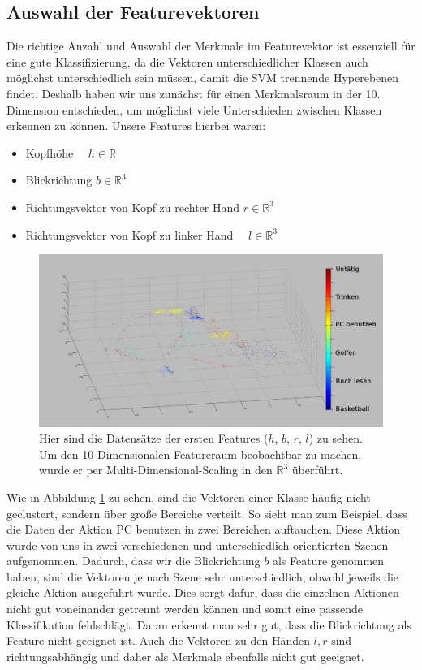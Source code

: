\subsection{Auswahl der Featurevektoren}
\label{subsec:auswahl-der-feature-vektoren}
Die richtige Anzahl und Auswahl der Merkmale im Featurevektor ist essenziell für eine gute Klassifizierung, da die Vektoren unterschiedlicher Klassen auch möglichst unterschiedlich sein müssen, damit die SVM trennende Hyperebenen findet. Deshalb haben wir uns zunächst für einen Merkmalsraum in der 10. Dimension entschieden, um möglichst viele Unterschieden zwischen Klassen erkennen zu können. Unsere Features hierbei waren:
\begin{itemize}
    \item Kopfhöhe \ \ \quad\qquad\qquad\qquad\qquad\qquad\qquad\qquad$h \in \mathbb{R}$
    \item Blickrichtung \qquad\qquad\qquad\qquad\qquad\qquad\qquad$b \in \mathbb{R}^3$
    \item Richtungsvektor von Kopf zu rechter Hand \quad $r \in \mathbb{R}^3$    
    \item Richtungsvektor von Kopf zu linker Hand \ \ \quad $l \in \mathbb{R}^3$
\end{itemize}
\begin{figure}[hbtp]
\includegraphics[width=1.0\linewidth]{OldFeatures.png}
\caption{Hier sind die Datensätze der ersten Features ($h$, $b$, $r$, $l$) zu sehen. Um den 10-Dimensionalen Featureraum beobachtbar zu machen, wurde er per Multi-Dimensional-Scaling in den $\mathbb{R}^3$ überführt.}
\label{fig:Old-Features}
\end{figure}
Wie in Abbildung \ref{fig:Old-Features} zu sehen, sind die Vektoren einer Klasse häufig nicht geclustert, sondern über große Bereiche verteilt. So sieht man zum Beispiel, dass die Daten der Aktion \glqq{}PC benutzen\grqq{} in zwei Bereichen auftauchen. Diese Aktion wurde von uns in zwei verschiedenen und unterschiedlich orientierten Szenen aufgenommen. Dadurch, dass wir die Blickrichtung $b$ als Feature genommen haben, sind die Vektoren je nach Szene sehr unterschiedlich, obwohl jeweils die gleiche Aktion ausgeführt wurde. Dies sorgt dafür, dass die einzelnen Aktionen nicht gut voneinander getrennt werden können und somit eine passende Klassifikation fehlschlägt. Daran erkennt man sehr gut, dass die Blickrichtung als Feature nicht geeignet ist. Auch die Vektoren zu den Händen $l,r$ sind richtungsabhängig und daher als Merkmale ebenfalls nicht gut geeignet.\\
